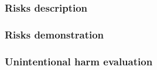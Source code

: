 \documentclass{article}
\begin{document}
\subsubsection{Risks description}


\subsubsection{Risks demonstration}


\subsubsection{Unintentional harm evaluation}

\end{document}
